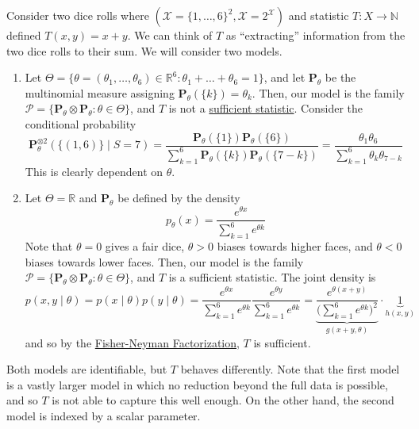   \begin{example}
    \label{ex:sums-of-two-dice}
 
    Consider two dice rolls where $(\mathcal{X} = \{1, \ldots, 6\}^2, \mathscr{X} = 2^\mathcal{X})$ and statistic $T: X \to \mathbb{N}$ defined $T(x, y) = x + y$. We can think of $T$ as ``extracting'' information from the two dice rolls to their sum. We will consider two models. 
    \begin{enumerate}
      \item Let $\Theta = \{ \theta = (\theta_1, \ldots, \theta_6) \in \mathbb{R}^6 \colon \theta_1 + \ldots + \theta_6 = 1 \}$, and let $\mathbf{P}_{\theta}$ be the multinomial measure assigning $\mathbf{P}_{\theta} (\{k\}) = \theta_k$. Then, our model is the family $\mathcal{P} = \{ \mathbf{P}_{\theta} \otimes \mathbf{P}_{\theta} \colon \theta \in \Theta \}$, and $T$ is not a \hyperref[def:sufficient-statistic]{sufficient statistic}. Consider the conditional probability 
        \begin{equation}
          \mathbf{P}_\theta^{\otimes 2}(\{(1, 6)\} \mid S = 7) = \frac{\mathbf{P}_{\theta} (\{1\}) \mathbf{P}_{\theta} (\{6\})}{\sum_{k=1}^6 \mathbf{P}_{\theta} (\{k\}) \mathbf{P}_{\theta} (\{7 - k\})} = \frac{\theta_1 \theta_6}{\sum_{k=1}^6 \theta_k \theta_{7 - k}}
        \end{equation}
        This is clearly dependent on $\theta$. 

      \item Let $\Theta = \mathbb{R}$ and $\mathbf{P}_{\theta}$ be defined by the density 
        \begin{equation}
          p_\theta (x) = \frac{e^{\theta x}}{\sum_{k=1}^6 e^{\theta k}} 
        \end{equation}
        Note that $\theta = 0$ gives a fair dice, $\theta > 0$ biases towards higher faces, and $\theta < 0$ biases towards lower faces. Then, our model is the family $\mathcal{P} = \{ \mathbf{P}_{\theta} \otimes \mathbf{P}_{\theta} \colon \theta \in \Theta \}$, and $T$ is a sufficient statistic. The joint density is 
        \begin{equation}
          p(x, y \mid \theta) = p(x \mid \theta) p(y \mid \theta) = \frac{e^{\theta x}}{\sum_{k=1}^6 e^{\theta k}} \frac{e^{\theta y}}{\sum_{k=1}^6 e^{\theta k}} = \underbrace{\frac{e^{\theta (x + y)}}{\big( \sum_{k=1}^6 e^{\theta k} \big)^2 }}_{g(x + y, \theta)} \cdot \underbrace{1}_{h (x, y)}
        \end{equation}
        and so by the \hyperref[thm:fisher-neyman-factorization]{Fisher-Neyman Factorization}, $T$ is sufficient. 
    \end{enumerate}

    Both models are identifiable, but $T$ behaves differently. Note that the first model is a vastly larger model in which no reduction beyond the full data is possible, and so $T$ is not able to capture this well enough. On the other hand, the second model is indexed by a scalar parameter. 
  \end{example}

